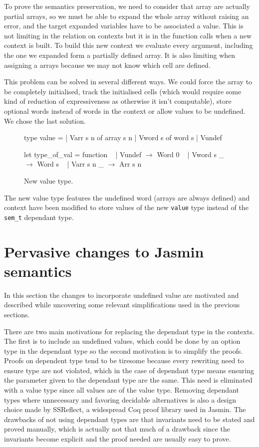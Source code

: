 \documentclass{article}
\begin{document}
\medskip

To prove the semantics preservation, we need to consider that array are actually
partial arrays, so we must be able to expand the whole array without raising an
error, and the target expanded variables have to be associated a value. This is
not limiting in the relation on contexts but it is in the function calls when a
new context is built. To build this new context we evaluate every argument,
including the one we expanded form a partially defined array. It is also
limiting when assigning a arrays because we may not know which cell are defined.

This problem can be solved in several different ways. We could force the array
to be completely initialised, track the initialised cells (which would require
some kind of reduction of expressiveness as otherwise it isn't computable),
store optional words instead of words in the context or allow values to be
undefined. We chose the last solution.

\smallskip

\begin{figure}[t]
\obeylines\obeyspaces\ttfamily%
type value =
| Varr s n of array s n
| Vword s  of word  s
| Vundef

let type\_of\_val = function
~ | Vundef     \(\rightarrow\) Word 0
~ | Vword s  \_ \(\rightarrow\) Word s
~ | Varr s n \_ \(\rightarrow\) Arr s n
\normalfont%
\caption{New value type.}
\end{figure}

The new value type features the undefined word (arrays are always defined) and
context have been modified to store values of the new \texttt{value} type
instead of the \texttt{sem\_t} dependant type.


\section{Pervasive changes to Jasmin semantics}\label{sec:perch}

In this section the changes to incorporate undefined value are motivated and
described while uncovering some relevant simplifications used in the previous
sections.

There are two main motivations for replacing the dependant type in the contexts.
The first is to include an undefined values, which could be done by an option
type in the dependant type so the second motivation is to simplify the proofs.
Proofs on dependent type tend to be tiresome because every rewriting need to
ensure type are not violated, which in the case of dependant type means ensuring
the parameter given to the dependant type are the same. This need is eliminated
with a value type since all values are of the value type. Removing dependant
types where unnecessary and favoring decidable alternatives is also a design
choice made by SSReflect, a widespread Coq proof library used in Jasmin. The
drawbacks of not using dependant types are that invariants need to be stated and
proved manually, which is actually not that much of a drawback since the
invariants become explicit and the proof needed are usually easy to prove.
\end{document}
